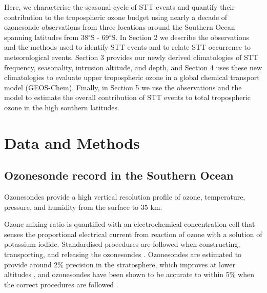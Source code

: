 \documentclass{article}
\begin{document}


    Here, we characterise the seasonal cycle of STT events and quantify their contribution to the tropospheric ozone budget using nearly a decade of ozonesonde observations from three locations around the Southern Ocean spanning latitudes from 38$^{\circ}$S - 69$^{\circ}$S. 
    In Section 2 we describe the observations and the methods used to identify STT events and to relate STT occurrence to meteorological events.
    Section 3 provides our newly derived climatologies of STT frequency, seasonality, intrusion altitude, and depth, and Section 4 uses these new climatologies to evaluate upper tropospheric ozone in a global chemical transport model (GEOS-Chem). 
    Finally, in Section 5 we use the observations and the model to estimate the overall contribution of STT events to total tropospheric ozone in the high southern latitudes.

\section{Data and Methods}

  \subsection{Ozonesonde record in the Southern Ocean}
  \label{Section:ozonesondes}
    Ozonesondes provide a high vertical resolution profile of ozone, temperature, pressure, and humidity from the surface to 35 km.
    
    Ozone mixing ratio is quantified with an electrochemical concentration cell that senses the proportional electrical current from reaction of ozone with a solution of potassium iodide.
    Standardised procedures are followed when constructing, transporting, and releasing the ozonesondes \citep{noaasondes}.
    Ozonesondes are estimated to provide around 2\% precision in the stratosphere, which improves at lower altitudes \citep{noaasondes}, and ozonesondes have been shown to be accurate to within 5\% when the correct procedures are followed \citep{Smit2007}.
    
\end{document}

